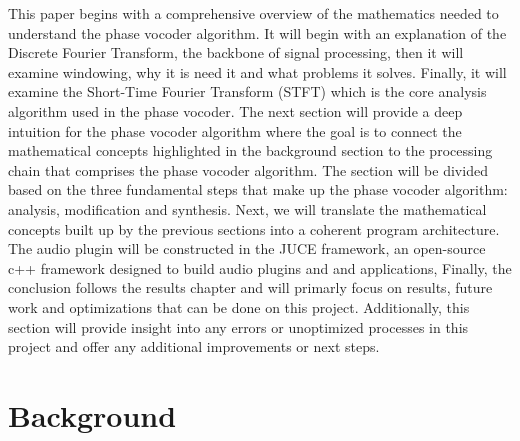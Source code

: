 \documentclass[12pt]{article}
\begin{document}
This paper begins with a comprehensive overview of the mathematics needed to understand the phase vocoder
algorithm. It will begin with an explanation of the Discrete Fourier Transform, the backbone of signal processing, then 
it will examine windowing, why it is need it and what problems it solves. Finally, it will examine the  Short-Time Fourier Transform (STFT)
which is the core analysis algorithm used in the phase vocoder. 
The next section will provide a deep intuition for the phase vocoder algorithm where the goal is to connect the
mathematical concepts highlighted in the background section to the processing chain that comprises the phase vocoder algorithm. 
The section will be divided based on the three fundamental steps that make up the phase vocoder algorithm: analysis, modification and synthesis. 
Next, we will translate the mathematical concepts built up by the previous sections into a coherent program architecture. The audio plugin will be 
constructed in the JUCE framework, an open-source c++ framework designed to build audio plugins and and applications, 
Finally, the conclusion follows the results chapter and will primarly focus on results, future work and optimizations that can be done 
on this project. Additionally, this section will provide insight into any errors or unoptimized processes in this project and offer
any additional improvements or next steps. 



\section{Background}
\end{document}

